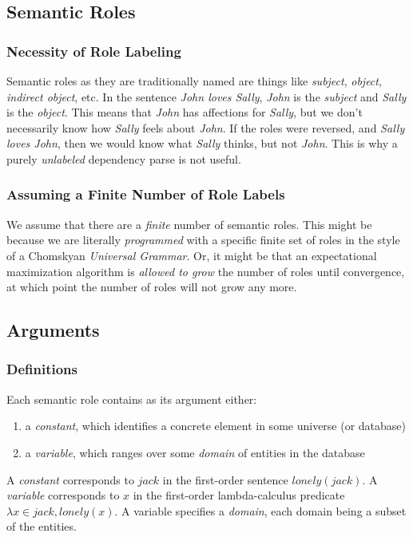 \documentclass[12pt]{article}
\begin{document}
\subsection{Semantic Roles}
\subsubsection{Necessity of Role Labeling}
Semantic roles as they are traditionally named are things like {\em subject}, {\em object}, {\em indirect object}, etc.
In the sentence {\em John loves Sally}, {\em John} is the {\em subject} and {\em Sally} is the {\em object}.
This means that {\em John} has affections for {\em Sally}, but we don't necessarily know how {\em Sally} feels about {\em John}.
If the roles were reversed, and {\em Sally loves John}, then we would know what {\em Sally} thinks, but not {\em John}.
This is why a purely {\em unlabeled} dependency parse is not useful.

\subsubsection{Assuming a Finite Number of Role Labels}
We assume that there are a {\em finite} number of semantic roles.
This might be because we are literally {\em programmed} with a specific finite set of roles in the style of a Chomskyan {\em Universal Grammar}.
Or, it might be that an expectational maximization algorithm is {\em allowed to grow} the number of roles until convergence, at which point the number of roles will not grow any more.

\subsection{Arguments}
\subsubsection{Definitions}
Each semantic role contains as its argument either:
\begin{enumerate}
    \item a \emph{constant}, which identifies a concrete element in some universe (or database)
    \item a \emph{variable}, which ranges over some \emph{domain} of entities in the database
\end{enumerate}
A {\em constant} corresponds to $jack$ in the first-order sentence $lonely(jack)$.
A {\em variable} corresponds to $x$ in the first-order lambda-calculus predicate $\lambda x \in jack, lonely(x)$.
A variable specifies a \emph{domain}, each domain being a subset of the entities.
\end{document}
